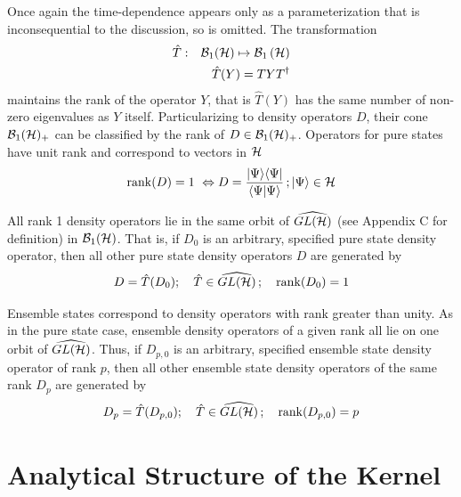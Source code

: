 \noindent Once again the time-dependence appears only as a parameterization
that is inconsequential to the discussion, so is omitted. The transformation 
\begin{eqnarray}
\hat{T} &:&{\cal B}_{1}({\cal H})\mapsto {\cal B}_{1}\left( {\cal H}\right) 
\nonumber \\
&&\hat{T}(Y)=TYT^{\dagger }
\end{eqnarray}%
maintains the rank of the operator $Y$, that is $\hat{T}(Y)$ has the same
number of non-zero eigenvalues as $Y$ itself. Particularizing to density
operators $D$, their cone ${\cal B}_{1}({\cal H})_{+}$ can be classified by
the rank of $D\in {\cal B}_{1}({\cal H})_{+}$. Operators for pure states
have unit rank and correspond to vectors in ${\cal H}$ 
\begin{equation}
\mathop{\rm rank}\nolimits(D)=1\,\,\Leftrightarrow D=\frac{|\Psi \rangle
\langle \Psi |}{\langle \Psi |\Psi \rangle }\,;|\Psi \rangle \in {\cal H}
\end{equation}

All rank 1 density operators lie in the same orbit of $\widehat{GL({\cal H})}
$ (see Appendix C for definition) in ${\cal B}_{1}({\cal H})$. That is, if $%
D_{0}$ is an arbitrary, specified pure state density operator, then all
other pure state density operators $D$ are generated by 
\begin{equation}
D=\hat{T}(D_{0});\quad \hat{T}\in \widehat{GL({\cal H})}\,;\quad \mathop{\rm
rank}\nolimits (D_{0})=1
\end{equation}

Ensemble states correspond to density operators with rank greater than
unity. As in the pure state case, ensemble density operators of a given rank
all lie on one orbit of $\widehat{GL({\cal H})}$. Thus, if $D_{p,0}$ is an
arbitrary, specified ensemble state density operator of rank $p$, then all
other ensemble state density operators of the same rank $D_{p}$ are
generated by 
\begin{equation}
D_{p}=\hat{T}(D_{p,0});\quad \hat{T}\in \widehat{GL({\cal H})}\,;\quad %
\mathop{\rm rank}\nolimits (D_{p,0})=p
\end{equation}

\section{Analytical Structure of the Kernel}

